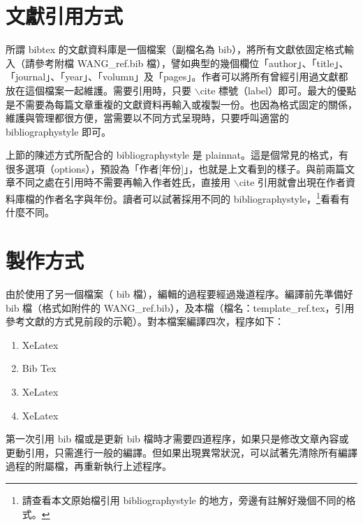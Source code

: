 \section{文獻引用方式}
所謂 bibtex 的文獻資料庫是一個檔案（副檔名為 bib），將所有文獻依固定格式輸入（請參考附檔 WANG\_ref.bib 檔），譬如典型的幾個欄位「author」、「title」、「journal」、「year」、「volumn」及「pages」。作者可以將所有曾經引用過文獻都放在這個檔案一起維護。需要引用時，只要 $\backslash$cite 標號（label）即可。最大的優點是不需要為每篇文章重複的文獻資料再輸入或複製一份。也因為格式固定的關係，維護與管理都很方便，當需要以不同方式呈現時，只要呼叫適當的 bibliographystyle 即可。

上節的陳述方式所配合的 bibliographystyle 是 {\E plainnat}。這是個常見的格式，有很多選項（options），預設為「作者[年份]」，也就是上文看到的樣子。與前兩篇文章不同之處在引用時不需要再輸入作者姓氏，直接用 $\backslash$cite 引用就會出現在作者資料庫檔的作者名字與年份。讀者可以試著採用不同的 bibliographystyle，\footnote{請查看本文原始檔引用 bibliographystyle 的地方，旁邊有註解好幾個不同的格式。}看看有什麼不同。

\section{製作方式}
由於使用了另一個檔案（ bib 檔），編輯的過程要經過幾道程序。編譯前先準備好 bib 檔（格式如附件的  WANG\_ref.bib），及本檔（檔名：template\_ref.tex，引用參考文獻的方式見前段的示範）。對本檔案編譯四次，程序如下：

\begin{enumerate}
\item XeLatex
\item Bib Tex
\item XeLatex
\item XeLatex
\end{enumerate}


第一次引用 bib 檔或是更新 bib 檔時才需要四道程序，如果只是修改文章內容或更動引用，只需進行一般的編譯。但如果出現異常狀況，可以試著先清除所有編譯過程的附屬檔，再重新執行上述程序。

%
%
%
%
%
%


%

%
